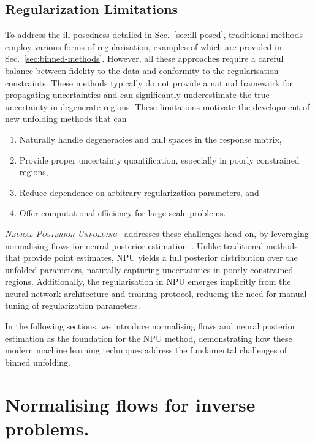 \subsection{Regularization Limitations}
    To address the ill-posedness detailed in Sec.~\ref{sec:ill-posed}, traditional methods employ various forms of regularisation, examples of which are provided in Sec.~\ref{sec:binned-methods}.
    However, all these approaches require a careful balance between fidelity to the data and conformity to the regularisation constraints.
    These methods typically do not provide a natural framework for propagating uncertainties and can significantly underestimate the true uncertainty in degenerate regions.
    These limitations motivate the development of new unfolding methods that can
    \begin{enumerate}
        \item Naturally handle degeneracies and null spaces in the response matrix,
        \item Provide proper uncertainty quantification, especially in poorly constrained regions,
        \item Reduce dependence on arbitrary regularization parameters, and
        \item Offer computational efficiency for large-scale problems.
    \end{enumerate}
    \emph{\textsc{Neural Posterior Unfolding}}~\cite{acosta2024npu} addresses these challenges head on, by leveraging normalising flows for neural posterior estimation~\cite{Papamakarios2016FastEstimation}.
    Unlike traditional methods that provide point estimates, NPU yields a full posterior distribution over the unfolded parameters, naturally capturing uncertainties in poorly constrained regions. 
    Additionally, the regularisation in NPU emerges implicitly from the neural network architecture and training protocol, reducing the need for manual tuning of regularization parameters.

    In the following sections, we introduce normalising flows and neural posterior estimation as the foundation for the NPU method, demonstrating how these modern machine learning techniques address the fundamental challenges of binned unfolding.
\section{Normalising flows for inverse problems.}
